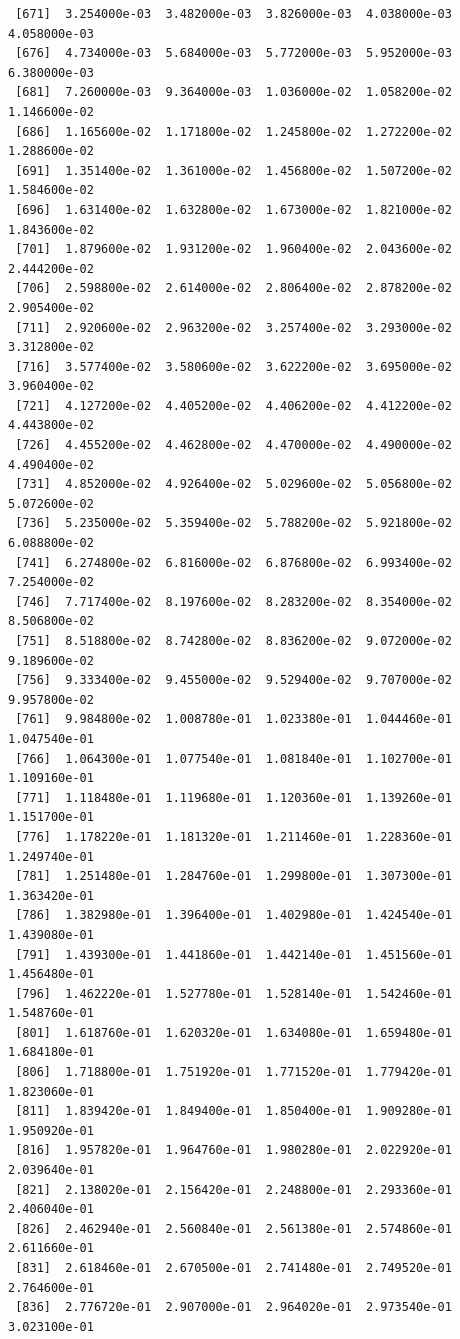 \documentclass[12pt,letterpaper]{article}\usepackage[]{graphicx}\usepackage[]{color}
\begin{document}
\begin{lstlisting}
 [671]  3.254000e-03  3.482000e-03  3.826000e-03  4.038000e-03  4.058000e-03
 [676]  4.734000e-03  5.684000e-03  5.772000e-03  5.952000e-03  6.380000e-03
 [681]  7.260000e-03  9.364000e-03  1.036000e-02  1.058200e-02  1.146600e-02
 [686]  1.165600e-02  1.171800e-02  1.245800e-02  1.272200e-02  1.288600e-02
 [691]  1.351400e-02  1.361000e-02  1.456800e-02  1.507200e-02  1.584600e-02
 [696]  1.631400e-02  1.632800e-02  1.673000e-02  1.821000e-02  1.843600e-02
 [701]  1.879600e-02  1.931200e-02  1.960400e-02  2.043600e-02  2.444200e-02
 [706]  2.598800e-02  2.614000e-02  2.806400e-02  2.878200e-02  2.905400e-02
 [711]  2.920600e-02  2.963200e-02  3.257400e-02  3.293000e-02  3.312800e-02
 [716]  3.577400e-02  3.580600e-02  3.622200e-02  3.695000e-02  3.960400e-02
 [721]  4.127200e-02  4.405200e-02  4.406200e-02  4.412200e-02  4.443800e-02
 [726]  4.455200e-02  4.462800e-02  4.470000e-02  4.490000e-02  4.490400e-02
 [731]  4.852000e-02  4.926400e-02  5.029600e-02  5.056800e-02  5.072600e-02
 [736]  5.235000e-02  5.359400e-02  5.788200e-02  5.921800e-02  6.088800e-02
 [741]  6.274800e-02  6.816000e-02  6.876800e-02  6.993400e-02  7.254000e-02
 [746]  7.717400e-02  8.197600e-02  8.283200e-02  8.354000e-02  8.506800e-02
 [751]  8.518800e-02  8.742800e-02  8.836200e-02  9.072000e-02  9.189600e-02
 [756]  9.333400e-02  9.455000e-02  9.529400e-02  9.707000e-02  9.957800e-02
 [761]  9.984800e-02  1.008780e-01  1.023380e-01  1.044460e-01  1.047540e-01
 [766]  1.064300e-01  1.077540e-01  1.081840e-01  1.102700e-01  1.109160e-01
 [771]  1.118480e-01  1.119680e-01  1.120360e-01  1.139260e-01  1.151700e-01
 [776]  1.178220e-01  1.181320e-01  1.211460e-01  1.228360e-01  1.249740e-01
 [781]  1.251480e-01  1.284760e-01  1.299800e-01  1.307300e-01  1.363420e-01
 [786]  1.382980e-01  1.396400e-01  1.402980e-01  1.424540e-01  1.439080e-01
 [791]  1.439300e-01  1.441860e-01  1.442140e-01  1.451560e-01  1.456480e-01
 [796]  1.462220e-01  1.527780e-01  1.528140e-01  1.542460e-01  1.548760e-01
 [801]  1.618760e-01  1.620320e-01  1.634080e-01  1.659480e-01  1.684180e-01
 [806]  1.718800e-01  1.751920e-01  1.771520e-01  1.779420e-01  1.823060e-01
 [811]  1.839420e-01  1.849400e-01  1.850400e-01  1.909280e-01  1.950920e-01
 [816]  1.957820e-01  1.964760e-01  1.980280e-01  2.022920e-01  2.039640e-01
 [821]  2.138020e-01  2.156420e-01  2.248800e-01  2.293360e-01  2.406040e-01
 [826]  2.462940e-01  2.560840e-01  2.561380e-01  2.574860e-01  2.611660e-01
 [831]  2.618460e-01  2.670500e-01  2.741480e-01  2.749520e-01  2.764600e-01
 [836]  2.776720e-01  2.907000e-01  2.964020e-01  2.973540e-01  3.023100e-01

\end{lstlisting}
\end{document}
